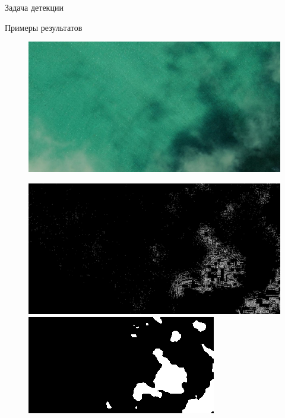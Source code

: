 \documentclass{beamer}
\begin{document}
\begin{section}{Задача детекции}
\begin{frame}{Примеры результатов}
\begin{figure}[H]
	\centering
	\includegraphics[scale=0.1]{maxar_maxar_16th_October_27_217_image.png}
\end{figure}

\begin{figure}
	\centering
	\begin{minipage}{0.5\textwidth}
		\includegraphics[scale=0.1]{maxar_maxar_16th_October_27_217_mask.png}
	\end{minipage}%
	\begin{minipage}{0.5\textwidth}
		\includegraphics[scale=0.4]{maxar_maxar_16th_October_27_217_results.png}
	\end{minipage}
\end{figure}

\end{frame}

\end{section}
\end{document}
